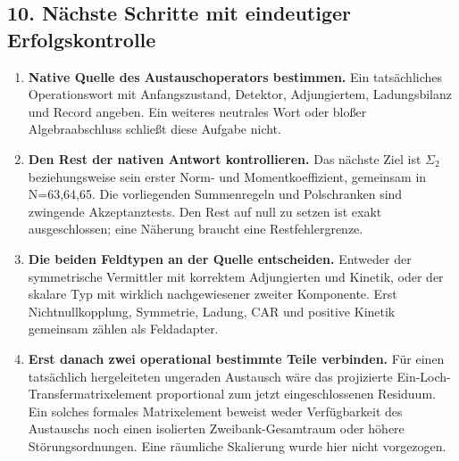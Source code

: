 \subsection{10. Nächste Schritte mit eindeutiger
Erfolgskontrolle}\label{nuxe4chste-schritte-mit-eindeutiger-erfolgskontrolle}

\begin{enumerate}
\def\labelenumi{\arabic{enumi}.}
\tightlist
\item
  \textbf{Native Quelle des Austauschoperators bestimmen.} Ein
  tatsächliches Operationswort mit Anfangszustand, Detektor,
  Adjungiertem, Ladungsbilanz und Record angeben. Ein weiteres neutrales
  Wort oder bloßer Algebraabschluss schließt diese Aufgabe nicht.
\item
  \textbf{Den Rest der nativen Antwort kontrollieren.} Das nächste Ziel
  ist \(\Sigma_2\) beziehungsweise sein erster Norm- und
  Momentkoeffizient, gemeinsam in N=63,64,65. Die vorliegenden
  Summenregeln und Polschranken sind zwingende Akzeptanztests. Den Rest
  auf null zu setzen ist exakt ausgeschlossen; eine Näherung braucht
  eine Restfehlergrenze.
\item
  \textbf{Die beiden Feldtypen an der Quelle entscheiden.} Entweder der
  symmetrische Vermittler mit korrektem Adjungierten und Kinetik, oder
  der skalare Typ mit wirklich nachgewiesener zweiter Komponente. Erst
  Nichtnullkopplung, Symmetrie, Ladung, CAR und positive Kinetik
  gemeinsam zählen als Feldadapter.
\item
  \textbf{Erst danach zwei operational bestimmte Teile verbinden.} Für
  einen tatsächlich hergeleiteten ungeraden Austausch wäre das
  projizierte Ein-Loch-Transfermatrixelement proportional zum jetzt
  eingeschlossenen Residuum. Ein solches formales Matrixelement beweist
  weder Verfügbarkeit des Austauschs noch einen isolierten
  Zweibank-Gesamtraum oder höhere Störungsordnungen. Eine räumliche
  Skalierung wurde hier nicht vorgezogen.
\end{enumerate}

